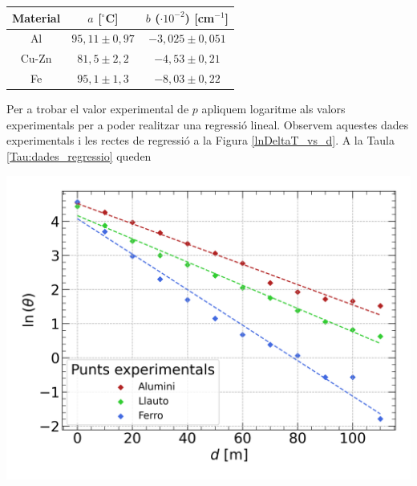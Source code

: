 \documentclass[12pt,twosides,onecolumn,openany]{article}
\newenvironment{Figura}
  {\par\medskip\noindent\minipage{\linewidth}}
  {\endminipage\par\medskip}
\begin{document}
\begin{multicols}{2}
\begin{Figura}
  \centering
  \begin{tabular}{c|c|c}
    Material & $a$ [$^\circ$C] & $b$ ($\cdot 10^{-2}$) [cm$^{-1}$]\\
    \hline\hline
    Al & $95,11\pm0,97$ & $-3,025\pm0,051$\\
    Cu-Zn & $81,5\pm2,2$ & $-4,53\pm0,21$ \\
    Fe & $95,1\pm1,3$ & $-8,03\pm0,22$
  \end{tabular}
  \label{Tau:coef_exponencial}
\end{Figura}

Per a trobar el valor experimental de $p$ apliquem logaritme als valors experimentals per a poder realitzar una regressió lineal. Observem aquestes dades experimentals i les rectes de regressió a la Figura \ref{lnDeltaT_vs_d}. A la Taula \ref{Tau:dades_regressio} queden
\begin{Figura}
  \centering
  \includegraphics[width = 1\linewidth]{../../graphs/practica_Ia/plots/reg_estacionaria.png}\label{lnDeltaT_vs_d}
\end{Figura}           


\end{multicols}
\end{document}

